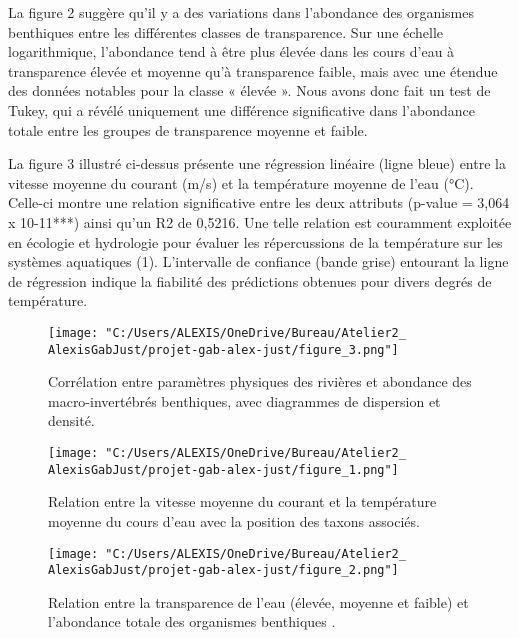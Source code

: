 \documentclass[9pt,twocolumn,twoside,]{pnas-new}
\begin{document}
La figure 2 suggère qu'il y a des variations dans l'abondance des
organismes benthiques entre les différentes classes de transparence. Sur
une échelle logarithmique, l'abondance tend à être plus élevée dans les
cours d'eau à transparence élevée et moyenne qu'à transparence faible,
mais avec une étendue des données notables pour la classe « élevée ».
Nous avons donc fait un test de Tukey, qui a révélé uniquement une
différence significative dans l'abondance totale entre les groupes de
transparence moyenne et faible.

La figure 3 illustré ci-dessus présente une régression linéaire (ligne
bleue) entre la vitesse moyenne du courant (m/s) et la température
moyenne de l'eau (°C). Celle-ci montre une relation significative entre
les deux attributs (p-value = 3,064 x 10-11***) ainsi qu'un R2 de
0,5216. Une telle relation est couramment exploitée en écologie et
hydrologie pour évaluer les répercussions de la température sur les
systèmes aquatiques (1). L'intervalle de confiance (bande grise)
entourant la ligne de régression indique la fiabilité des prédictions
obtenues pour divers degrés de température.

\begin{figure}
\centering
\texttt{[image: "C:/Users/ALEXIS/OneDrive/Bureau/Atelier2\_ AlexisGabJust/projet-gab-alex-just/figure\_3.png"]}
\caption{Corrélation entre paramètres physiques des rivières et
abondance des macro-invertébrés benthiques, avec diagrammes de
dispersion et densité. \label{fig:plot1}}
\end{figure}

\begin{figure}
\centering
\texttt{[image: "C:/Users/ALEXIS/OneDrive/Bureau/Atelier2\_ AlexisGabJust/projet-gab-alex-just/figure\_1.png"]}
\caption{Relation entre la vitesse moyenne du courant et la température
moyenne du cours d'eau avec la position des taxons associés.
\label{fig:plot1}}
\end{figure}

\begin{figure}
\centering
\texttt{[image: "C:/Users/ALEXIS/OneDrive/Bureau/Atelier2\_ AlexisGabJust/projet-gab-alex-just/figure\_2.png"]}
\caption{Relation entre la transparence de l'eau (élevée, moyenne et
faible) et l'abondance totale des organismes benthiques .
\label{fig:plot1}}
\end{figure}
\end{document}
